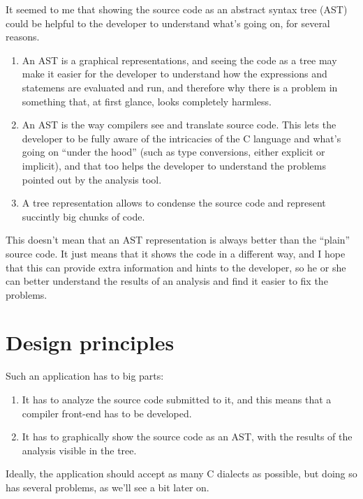 \documentclass[a4paper,openany]{article}
\begin{document}
It seemed to me that showing the source code as an abstract syntax tree (AST) could be helpful to the developer to understand what's going on, for several reasons.

\begin{enumerate}
\item An AST is a graphical representations, and seeing the code as a tree may make it easier for the developer to understand how the expressions and statemens are evaluated and run, and therefore why there is a problem in something that, at first glance, looks completely harmless.

\item An AST is the way compilers see and translate source code. This lets the devel\-oper to be fully aware of the intricacies of the C language and what's going on ``under the hood'' (such as type conversions, either explicit or implicit), and that too helps the developer to understand the problems pointed out by the analysis tool.

\item A tree representation allows to condense the source code and represent succintly big chunks of code.
\end{enumerate}

This doesn't mean that an AST representation is always better than the ``plain'' source code. It just means that it shows the code in a different way, and I hope that this can provide extra information and hints to the developer, so he or she can better understand the results of an analysis and find it easier to fix the problems.

\section{Design principles}
Such an application has to big parts:

\begin{enumerate}
\item It has to analyze the source code submitted to it, and this means that a compiler front-end has to be developed.

\item It has to graphically show the source code as an AST, with the results of the analysis visible in the tree.
\end{enumerate}

Ideally, the application should accept as many C dialects as possible, but doing so has several problems, as we'll see a bit later on.
\end{document}
